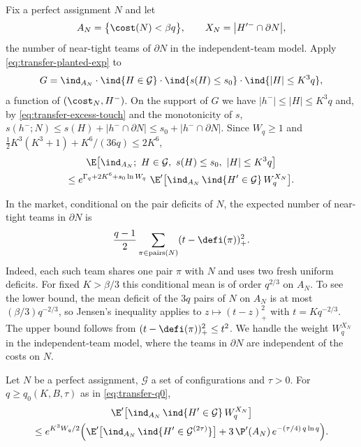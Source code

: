 Fix a perfect assignment $N$ and let
\[
A_N=\bigl\{\cost(N)<\beta q\bigr\},\qquad
X_N=\bigl|H'^-\cap\partial N\bigr|,
\]
the number of near-tight teams of $\partial N$ in the independent-team model. Apply
\eqref{eq:transfer-planted-exp} to
\[
G=\ind_{A_N}\cdot\ind\{H\in\mathcal G\}\cdot\ind\{s(H)\le s_0\}\cdot\ind\{|H|\le K^3q\},
\]
a function of $(\cost_N,H^-)$. On the support of $G$ we have $|h^-|\le|H|\le K^3q$ and, by
\eqref{eq:transfer-excess-touch} and the monotonicity of $s$,
$s(h^-;N)\le s(H)+|h^-\cap\partial N|\le s_0+|h^-\cap\partial N|$. Since $W_q\ge1$ and
$\tfrac12K^3(K^3+1)+K^6/(36q)\le2K^6$,
\begin{multline}\label{eq:transfer-rho}
\E\bigl[\ind_{A_N};\ H\in\mathcal G,\ s(H)\le s_0,\ |H|\le K^3q\bigr]\\
\le e^{\Gamma_q+2K^6+s_0\ln W_q}\ \E'\bigl[\ind_{A_N}\,\ind\{H'\in\mathcal G\}\,W_q^{X_N}\bigr].
\end{multline}

In the market, conditional on the pair deficits of $N$, the expected number of near-tight
teams in $\partial N$ is
\[
 \frac{q-1}{2}\sum_{\pi\in\operatorname{pairs}(N)}(t-\defi(\pi))_+^2.
\]
Indeed, each such team shares one pair $\pi$ with $N$ and uses two fresh uniform
deficits. For fixed $K>\beta/3$ this conditional mean is of order $q^{2/3}$ on $A_N$.
To see the lower bound, the mean deficit of the $3q$ pairs of $N$ on $A_N$ is at most
$(\beta/3)q^{-2/3}$, so Jensen's inequality applies to $z\mapsto(t-z)_+^2$ with
$t=Kq^{-2/3}$. The upper bound follows from $(t-\defi(\pi))_+^2\le t^2$.
We handle the weight $W_q^{X_N}$ in the independent-team model, where the teams in
$\partial N$ are independent of the costs on $N$.

\begin{lemma}\label{lem:transfer-touch}
Let $N$ be a perfect assignment, $\mathcal G$ a set of configurations and $\tau>0$. For
$q\ge q_0(K,B,\tau)$ as in \eqref{eq:transfer-q0},
\begin{multline*}
\E'\bigl[\ind_{A_N}\,\ind\{H'\in\mathcal G\}\,W_q^{X_N}\bigr]\\
\le e^{K^3W_q/2}\Bigl(\E'\bigl[\ind_{A_N}\,\ind\{H'\in\mathcal G^{(2\tau)}\}\bigr]
+3\,\P'(A_N)\,e^{-(\tau/4)\,q\ln q}\Bigr).
\end{multline*}
\end{lemma}


